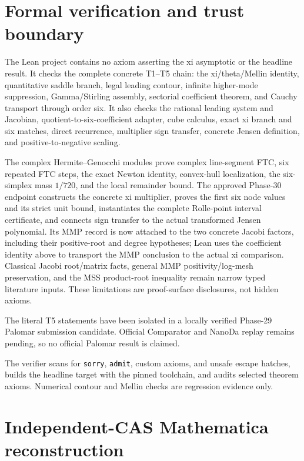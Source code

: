 \documentclass[11pt]{article}
\theoremstyle{definition}
\theoremstyle{remark}
\begin{document}
\section{Formal verification and trust boundary}\label{sec:formal}

The Lean project contains no axiom asserting the xi asymptotic or the headline
result.  It checks the complete concrete T1--T5 chain: the xi/theta/Mellin
identity, quantitative saddle branch, legal leading contour, infinite
higher-mode suppression, Gamma/Stirling assembly, sectorial coefficient
theorem, and Cauchy transport through order six.  It also checks the rational
leading system and Jacobian, quotient-to-six-coefficient adapter, cube
calculus, exact xi branch and six matches, direct recurrence, multiplier sign
transfer, concrete Jensen definition, and positive-to-negative scaling.

The complex Hermite--Genocchi modules prove complex line-segment FTC, six
repeated FTC steps, the exact Newton identity, convex-hull localization, the
six-simplex mass $1/720$, and the local remainder bound.  The approved
Phase-30 endpoint constructs the concrete xi multiplier, proves the first six
node values and its strict unit bound, instantiates the complete
Rolle-point interval certificate, and connects sign transfer to the actual
transformed Jensen polynomial.  Its MMP record is now attached to the two
concrete Jacobi factors, including their positive-root and degree hypotheses;
Lean uses the coefficient identity above to transport the MMP conclusion to
the actual xi comparison.  Classical Jacobi root/matrix facts, general MMP
positivity/log-mesh preservation, and the MSS product-root inequality remain
narrow typed literature inputs.  These limitations are proof-surface
disclosures, not hidden axioms.

The literal T5 statements have been isolated in a locally verified Phase-29
Palomar submission candidate.  Official Comparator and NanoDa replay remains
pending, so no official Palomar result is claimed.

The verifier scans for \texttt{sorry}, \texttt{admit}, custom axioms, and
unsafe escape hatches, builds the headline target with the pinned toolchain,
and audits selected theorem axioms.  Numerical contour and Mellin checks are
regression evidence only.

\section{Independent-CAS Mathematica reconstruction}\label{sec:mathematica}
\end{document}

